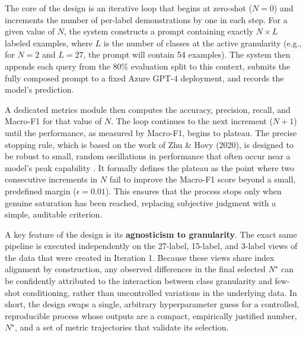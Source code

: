 The core of the design is an iterative loop that begins at zero-shot ($N=0$) and increments the number of per-label demonstrations by one in each step. For a given value of $N$, the system constructs a prompt containing exactly $N \times L$ labeled examples, where $L$ is the number of classes at the active granularity (e.g., for $N=2$ and $L=27$, the prompt will contain 54 examples). The system then appends each query from the 80\% evaluation split to this context, submits the fully composed prompt to a fixed Azure GPT-4 deployment, and records the model's prediction.

A dedicated metrics module then computes the accuracy, precision, recall, and Macro-F1 for that value of $N$. The loop continues to the next increment ($N+1$) until the performance, as measured by Macro-F1, begins to plateau. The precise stopping rule, which is based on the work of Zhu \& Hovy (2020), is designed to be robust to small, random oscillations in performance that often occur near a model's peak capability \cite{zhu2020stopping}. It formally defines the plateau as the point where two consecutive increments in $N$ fail to improve the Macro-F1 score beyond a small, predefined margin ($\epsilon = 0.01$). This ensures that the process stops only when genuine saturation has been reached, replacing subjective judgment with a simple, auditable criterion.

A key feature of the design is its \textbf{agnosticism to granularity}. The exact same pipeline is executed independently on the 27-label, 15-label, and 3-label views of the data that were created in Iteration 1. Because these views share index alignment by construction, any observed differences in the final selected $N^{\star}$ can be confidently attributed to the interaction between class granularity and few-shot conditioning, rather than uncontrolled variations in the underlying data. In short, the design swaps a single, arbitrary hyperparameter guess for a controlled, reproducible process whose outputs are a compact, empirically justified number, $N^{\star}$, and a set of metric trajectories that validate its selection.

